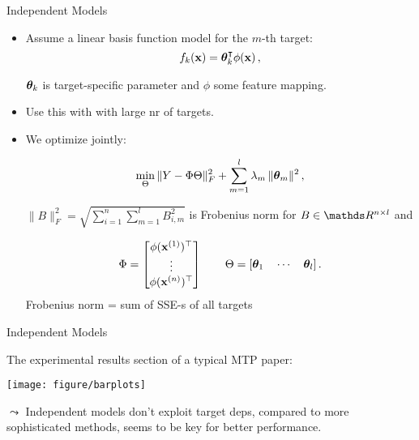\documentclass[11pt,compress,t,notes=noshow, xcolor=table]{beamer}
\begin{document}
\begin{frame}{Independent Models}

	\begin{itemize}
	
		\item Assume a linear basis function model for the $m$-th target: 
		\begin{equation*}
			f_{k}(\mathbf{x}) = \bm{\theta}_k^\intercal \phi(\mathbf{x}) \,,
			\label{eq:binrel}
		\end{equation*}

		$\bm{\theta}_k$ is target-specific parameter and $\phi$ some feature mapping.
        \item Use this with with large nr of targets. 

		\item We optimize jointly:
  
		\begin{equation*}
			\label{eq:multiridge}
			\min_\Theta \|Y - \Phi \Theta \|^2_F +  \sum_{m=1}^l \lambda_m \,\|\bm{\theta}_m\|^2 \,,
		\end{equation*}

		$ \| B \|^2_F  = \sqrt{ \sum_{i=1}^n \sum_{m=1}^l B_{i,m}^2 } $ is Frobenius norm for $B \in \R^{n \times l}$ and 
	
		\begin{equation*}
			\label{eq:notation}
			\Phi = \begin{bmatrix} \phi(\mathbf{x}^{(1)})^\top \\ \vdots \\ \phi(\mathbf{x}^{(n)})^\top \end{bmatrix} \qquad \Theta = [\bm{\theta}_1 \quad \cdots \quad \bm{\theta}_l] \,.
		\end{equation*}
  Frobenius norm = sum of SSE-s of all targets
	\end{itemize}

\end{frame}

\begin{frame}{Independent Models}

	The experimental results section of a typical MTP paper: 

	\begin{center}
		\texttt{[image: figure/barplots]} \\
	\end{center}

	$\leadsto$ Independent models don't exploit target deps, compared to more sophisticated methods, seems to be key for better performance.

\end{frame}
\end{document}
